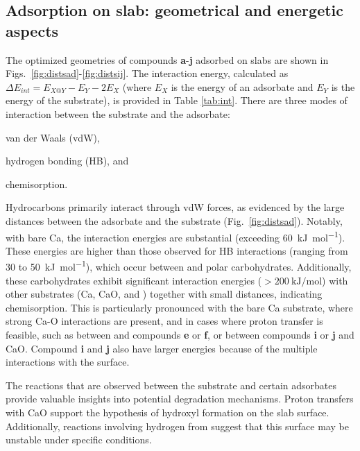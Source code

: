 \documentclass[12pt,a4paper]{article}
\begin{document}
\subsection{Adsorption on slab: geometrical and energetic aspects}

The optimized geometries of compounds \textbf{a}-\textbf{j} adsorbed on slabs are shown in Figs.~\ref{fig:distsad}-\ref{fig:distsij}. The interaction energy, calculated as $\Delta E_{int} = E_{X@Y} - E_Y - 2E_X$ (where $E_X$ is the energy of an adsorbate and $E_Y$ is the energy of the substrate), is provided in Table \ref{tab:int}. There are three modes of interaction between the substrate and the adsorbate: \begin{inparaenum}[i)]
	\item van der Waals (vdW),
	\item hydrogen bonding (HB), and
	\item chemisorption.
\end{inparaenum}

Hydrocarbons primarily interact through vdW forces, as evidenced by the large distances between the adsorbate and the substrate (Fig.~\ref{fig:distsad}). Notably, with bare Ca, the interaction energies are substantial (exceeding \SI{60}{\kilo\joule\per\mole}). These energies are higher than those observed for HB interactions (ranging from 30 to \SI{50}{\kilo\joule\per\mole}), which occur between  and polar carbohydrates. Additionally, these carbohydrates exhibit significant interaction energies ($>\SI{200}{\kilo\joule\per\mole}$) with other substrates (Ca, CaO, and ) together with small distances, indicating chemisorption. This is particularly pronounced with the bare Ca substrate, where strong Ca-O interactions are present, and in cases where proton transfer is feasible, such as between  and compounds \textbf{e} or \textbf{f}, or between compounds \textbf{i} or \textbf{j} and CaO. Compound \textbf{i} and \textbf{j} also have larger energies because of the multiple interactions with the surface.

The reactions that are observed between the substrate and certain adsorbates provide valuable insights into potential degradation mechanisms. Proton transfers with CaO support the hypothesis of hydroxyl formation on the slab surface. Additionally, reactions involving hydrogen from  suggest that this surface may be unstable under specific conditions.
\end{document}
